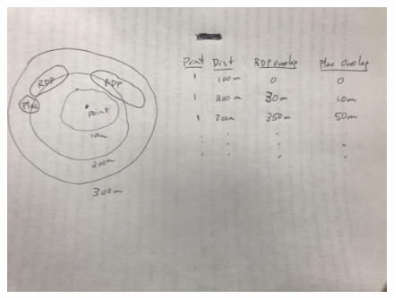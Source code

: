 \documentclass[12pt]{article}
\begin{document}
\pagebreak



\begin{figure}
\centering
\includegraphics[scale=.11]{figures/overlap_drawing.jpg}
\end{figure}
















\end{document}

